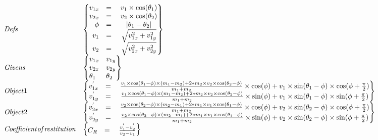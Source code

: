 \documentclass[10pt,a4paper,landscape]{article}
\author{Patrick Rye}
\begin{document}
	\begin{equation*}
		\begin{matrix}\mathit{Defs}\hfill\null &\left\{\begin{matrix}\hfill
				v_{1x}&=\hfill\null &v_{1}\times \cos (\theta _{1})\\\hfill
				v_{2x}&=\hfill\null &v_{2}\times \cos (\theta _{2})\\\hfill \phi
				&=\hfill\null &|\theta _{1}-\theta _{2}|\\\hfill v_{1}&=\hfill\null
				&\sqrt{v_{1x}^{2}+v_{1y}^{2}}\\\hfill v_{2}&=\hfill\null
				&\sqrt{v_{2x}^{2}+v_{2y}^{2}}\end{matrix}\right\}\hfill\null
			\\\mathit{Givens}\hfill\null &\left\{\begin{matrix}v_{1x}\hfill\null
				&v_{1y}\hfill\null \\v_{2x}\hfill\null &v_{2y}\hfill\null \\\theta
				_{1}\hfill\null &\theta _{2}\hfill\null \end{matrix}\right\}\hfill\null
			\\\mathit{Object}1\hfill\null &\left\{\begin{matrix}\hfill
				v_{1x}^{'}&=\hfill\null &\frac{v_{1}\times \cos (\theta _{1}-\phi
					)\times (m_{1}-m_{2})+2\ast m_{2}\times v_{2}\times \cos (\theta
					_{2}-\phi )}{m_{1}+m_{2}}\times \cos (\phi )+v_{1}\times \sin (\theta
				_{1}-\phi )\times \cos (\phi +\frac{\pi }{2})\\\hfill
				v_{1y}^{'}&=\hfill\null &\frac{v_{1}\times \cos (\theta _{1}-\phi
					)\times (m_{1}-m_{2})+2\ast m_{2}\times v_{2}\times \cos (\theta
					_{2}-\phi )}{m_{1}+m_{2}}\times \sin (\phi )+v_{1}\times \sin (\theta
				_{1}-\phi )\times \sin (\phi +\frac{\pi
				}{2})\end{matrix}\right\}\hfill\null \\\mathit{Object}2\hfill\null
			&\left\{\begin{matrix}\hfill v_{2x}^{'}&=\hfill\null &\frac{v_{2}\times
					\cos (\theta _{2}-\phi )\times (m_{2}-m_{1})+2\ast m_{1}\times
					v_{1}\times \cos (\theta _{1}-\phi )}{m_{1}+m_{2}}\times \cos (\phi
				)+v_{2}\times \sin (\theta _{2}-\phi )\times \cos (\phi +\frac{\pi
				}{2})\\\hfill v_{2y}^{'}&=\hfill\null &\frac{v_{2}\times \cos (\theta
				_{2}-\phi )\times (m_{2}-m_{1})+2\ast m_{1}\times v_{1}\times \cos
				(\theta _{1}-\phi )}{m_{1}+m_{2}}\times \sin (\phi )+v_{2}\times \sin
			(\theta _{2}-\phi )\times \sin (\phi +\frac{\pi
			}{2})\end{matrix}\right\}\hfill\null
		\\\mathit{Coefficient}\mathit{of}\mathit{restitution}\hfill\null
		&\left\{\begin{matrix}C_{R}\hfill\null &=\hfill\null
			&\frac{v_{1}^{'}-v_{2}^{'}}{v_{2}-v_{1}}\hfill\null
		\end{matrix}\right\}\hfill\null \end{matrix}\hfill
\end{equation*}
\end{document}
